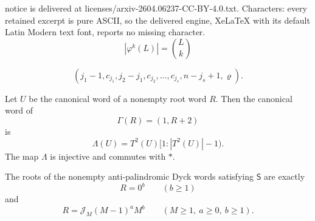 \documentclass[10pt,a4paper]{amsart}
\newcommand{\Lam}{\Lambda}
\newcommand{\Star}{*}
\begin{document}
notice is delivered at licenses/arxiv-2604.06237-CC-BY-4.0.txt. Characters: every retained excerpt is pure ASCII, so the delivered engine, XeLaTeX with its default Latin Modern text font, reports no missing character.
\begin{equation}
\label{eq:phi-binomial-length}
 |\varphi^k(L)|=\binom Lk
\end{equation}

\begin{equation}
\label{eq:run-vector}
 (j_1-1,c_{j_1},j_2-j_1,c_{j_2},\ldots,
 c_{j_s},n-j_s+1,\varrho).
\end{equation}

\begin{lemma}
\label{lem:root-suspension}
Let \(U\) be the canonical word of a nonempty root word \(R\).  Then the
canonical word of
\[
 \Gamma(R)=(1,R+2)
\]
is
\[
 \Lam(U)=T^2(U)[1:|T^2(U)|-1).
\]
The map \(\Lam\) is injective and commutes with \(\Star\).
\end{lemma}

\begin{theorem}
\label{thm:root-classification}
The roots of the nonempty anti-palindromic Dyck words satisfying
\(\mathsf S\) are exactly
\begin{equation*}
 R=0^b\qquad(b\geq1)
\end{equation*}
and
\begin{equation}
\label{eq:classified-root-positive}
 R=\mathcal J_M(M-1)^aM^b
 \qquad(M\geq1,\ a\geq0,\ b\geq1).
\end{equation}
\end{theorem}
\end{document}
